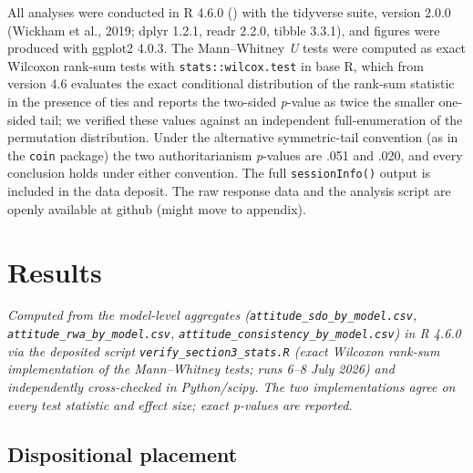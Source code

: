 \documentclass[
]{article}
\begin{document}
All analyses were conducted in R 4.6.0 () with the tidyverse suite, version 2.0.0 (Wickham et
al., 2019; dplyr 1.2.1, readr 2.2.0, tibble 3.3.1), and figures were
produced with ggplot2 4.0.3. The Mann--Whitney \emph{U} tests were
computed as exact Wilcoxon rank-sum tests with
\texttt{stats::wilcox.test} in base R, which from version 4.6 evaluates
the exact conditional distribution of the rank-sum statistic in the
presence of ties and reports the two-sided \emph{p}-value as twice the
smaller one-sided tail; we verified these values against an independent
full-enumeration of the permutation distribution. Under the alternative
symmetric-tail convention (as in the \texttt{coin} package) the two
authoritarianism \emph{p}-values are .051 and .020, and every conclusion
holds under either convention. The full \texttt{sessionInfo()} output is
included in the data deposit. The raw response data and the analysis
script are openly available at github (might move to appendix).

\section{Results}\label{results}

\emph{Computed from the model-level aggregates
(\texttt{attitude\_sdo\_by\_model.csv},
\texttt{attitude\_rwa\_by\_model.csv},
\texttt{attitude\_consistency\_by\_model.csv}) in R 4.6.0 via the
deposited script \texttt{verify\_section3\_stats.R} (exact Wilcoxon
rank-sum implementation of the Mann--Whitney tests; runs 6--8 July 2026)
and independently cross-checked in Python/scipy. The two implementations
agree on every test statistic and effect size; exact p-values are
reported.}

\subsection{Dispositional placement}\label{dispositional-placement}
\end{document}
